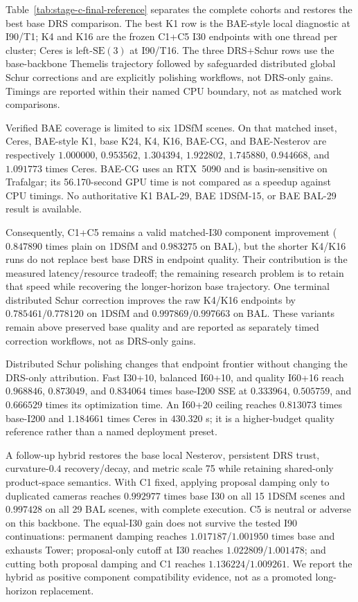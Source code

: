 Table~\ref{tab:stage-c-final-reference} separates the complete cohorts and
restores the best base DRS comparison.  The best K1 row is the BAE-style local
diagnostic at I90/T1; K4 and K16 are the frozen C1+C5 I30 endpoints with one
thread per cluster; Ceres is left-$\mathrm{SE}(3)$ at I90/T16.  The three
DRS+Schur rows use the base-backbone Themelis trajectory followed by safeguarded
distributed global Schur corrections and are explicitly polishing workflows,
not DRS-only gains.  Timings are reported within their named CPU boundary, not
as matched work comparisons.



Verified BAE coverage is limited to six 1DSfM scenes.  On that matched inset,
Ceres, BAE-style K1, base K24, K4, K16, BAE-CG, and BAE-Nesterov are
respectively $1.000000$, $0.953562$, $1.304394$, $1.922802$, $1.745880$,
$0.944668$, and $1.091773$ times Ceres.
BAE-CG uses an RTX~5090 and is basin-sensitive on Trafalgar; its 56.170-second
GPU time is not compared as a speedup against CPU timings.  No authoritative
K1 BAL-29, BAE 1DSfM-15, or BAE BAL-29 result is available.

Consequently, C1+C5 remains a valid matched-I30 component improvement
($0.847890$ times plain on 1DSfM and $0.983275$ on BAL), but the shorter K4/K16
runs do not replace best base DRS in endpoint quality.  Their contribution is
the measured latency/resource tradeoff; the remaining research problem is to
retain that speed while recovering the longer-horizon base trajectory.  One
terminal distributed Schur correction improves the raw K4/K16 endpoints by
$0.785461/0.778120$ on 1DSfM and $0.997869/0.997663$ on BAL.  These variants
remain above preserved base quality and are reported as separately timed
correction workflows, not as DRS-only gains.

Distributed Schur polishing changes that endpoint frontier without changing
the DRS-only attribution.  Fast I30+10, balanced I60+10, and quality I60+16
reach $0.968846$, $0.873049$, and $0.834064$ times base-I200 SSE at $0.333964$,
$0.505759$, and $0.666529$ times its optimization time.  An I60+20 ceiling
reaches $0.813073$ times base-I200 and $1.184661$ times Ceres in $430.320$ s;
it is a higher-budget quality reference rather than a named deployment preset.

A follow-up hybrid restores the base local Nesterov, persistent DRS trust,
curvature-$0.4$ recovery/decay, and metric scale 75 while retaining shared-only
product-space semantics.  With C1 fixed, applying proposal damping only to
duplicated cameras reaches $0.992977$ times base I30 on all 15 1DSfM scenes and
$0.997428$ on all 29 BAL scenes, with complete execution.  C5 is neutral or
adverse on this backbone.  The equal-I30 gain does not survive the tested I90
continuations: permanent damping reaches $1.017187$/$1.001950$ times base and
exhausts Tower; proposal-only cutoff at I30 reaches $1.022809$/$1.001478$; and
cutting both proposal damping and C1 reaches $1.136224$/$1.009261$.  We report
the hybrid as positive component compatibility evidence, not as a promoted
long-horizon replacement.

